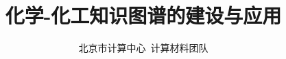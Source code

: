 
\title{化学-化工知识图谱的建设与应用}
\author[ ]{北京市计算中心~计算材料团队}   %
\renewcommand*{\Authfont}{\small\rm} %
\renewcommand*{\Affilfont}{\small\it} %
\renewcommand\Authands{ and } %
\renewcommand\Authands{ , } %
\date{} %


\maketitle
